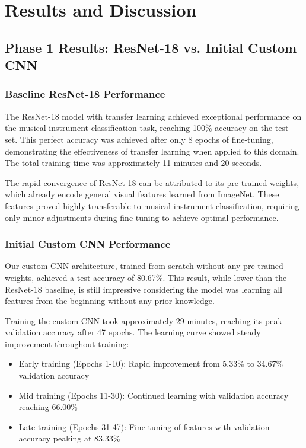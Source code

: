 
\section{Results and Discussion}

\subsection{Phase 1 Results: ResNet-18 vs. Initial Custom CNN}

\subsubsection{Baseline ResNet-18 Performance}
The ResNet-18 model with transfer learning achieved exceptional performance on the musical instrument classification task, reaching 100\% accuracy on the test set. This perfect accuracy was achieved after only 8 epochs of fine-tuning, demonstrating the effectiveness of transfer learning when applied to this domain. The total training time was approximately 11 minutes and 20 seconds.

The rapid convergence of ResNet-18 can be attributed to its pre-trained weights, which already encode general visual features learned from ImageNet. These features proved highly transferable to musical instrument classification, requiring only minor adjustments during fine-tuning to achieve optimal performance.

\subsubsection{Initial Custom CNN Performance}
Our custom CNN architecture, trained from scratch without any pre-trained weights, achieved a test accuracy of 80.67\%. This result, while lower than the ResNet-18 baseline, is still impressive considering the model was learning all features from the beginning without any prior knowledge.

Training the custom CNN took approximately 29 minutes, reaching its peak validation accuracy after 47 epochs. The learning curve showed steady improvement throughout training:
\begin{itemize}
    \item Early training (Epochs 1-10): Rapid improvement from 5.33\% to 34.67\% validation accuracy
    \item Mid training (Epochs 11-30): Continued learning with validation accuracy reaching 66.00\%
    \item Late training (Epochs 31-47): Fine-tuning of features with validation accuracy peaking at 83.33\%
\end{itemize}

